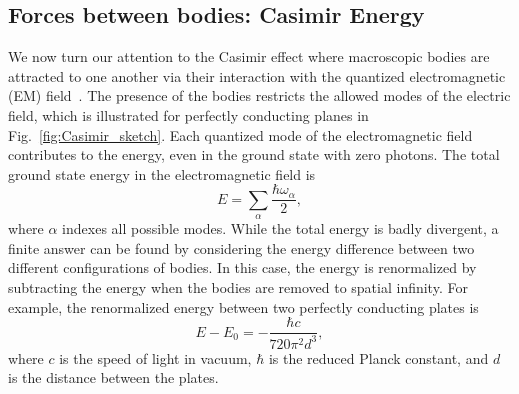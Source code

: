 

\subsection{Forces between bodies: Casimir Energy}

We now turn our attention to the Casimir effect where macroscopic bodies are attracted to 
one another via their interaction with the quantized electromagnetic (EM) field~\cite{Casimir1948}.  
The presence of the bodies restricts the allowed modes of the electric field, 
which is illustrated for perfectly conducting planes in Fig.~\ref{fig:Casimir_sketch}.
Each quantized mode of the electromagnetic field contributes
to the energy, even in the ground state with zero photons.
The total ground state energy in the electromagnetic field is 
\begin{equation}
  E=\sum_\alpha\frac{\hbar\omega_{\alpha}}{2},
\end{equation}
where $\alpha$ indexes all possible modes.  
While the total energy is badly divergent, a finite answer can be found by considering 
the energy difference between two different configurations of bodies.  
In this case, the energy is renormalized by subtracting the energy when the bodies are removed to spatial infinity.  
For example, the renormalized energy between two perfectly conducting plates is
\begin{equation}
  E-E_0 = -\frac{\hbar c}{720\pi^2 d^3},\label{eq:Casimir_energy}
\end{equation}
where $c$ is the speed of light in vacuum, $\hbar$ is the reduced Planck constant,
and $d$ is the distance between the plates.  %

